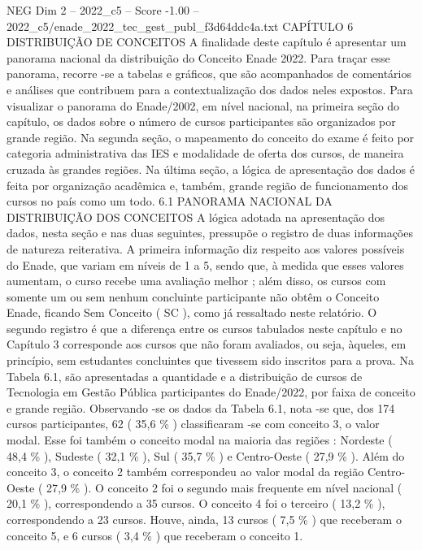 \begin{textsample}{NEG Dim 2 – 2022\_c5 – Score -1.00 – 2022\_c5/enade\_2022\_tec\_gest\_publ\_f3d64ddc4a.txt}  \label{ex:f2_neg_220}
CAPÍTULO 6 DISTRIBUIÇÃO DE CONCEITOS A finalidade deste capítulo é apresentar um panorama nacional da distribuição do Conceito Enade 2022.
Para traçar esse panorama, recorre -se a tabelas e gráficos, que são acompanhados de comentários e análises que contribuem para a contextualização dos dados neles expostos.
Para visualizar o panorama do Enade/2002, em nível nacional, na primeira seção do capítulo, os dados sobre o número de cursos participantes são organizados por grande região.
Na segunda seção, o mapeamento do conceito do exame é feito por categoria administrativa das IES e modalidade de oferta dos cursos, de maneira cruzada às grandes regiões.
Na última seção, a lógica de apresentação dos dados é feita por organização acadêmica e, também, grande região de funcionamento dos cursos no país como um todo. 6.1 PANORAMA NACIONAL DA DISTRIBUIÇÃO DOS CONCEITOS A lógica adotada na apresentação dos dados, nesta seção e nas duas seguintes, pressupõe o registro de duas informações de natureza reiterativa.
A primeira informação diz respeito aos valores possíveis do Enade, que variam em níveis de 1 a 5, sendo que, à medida que esses valores aumentam, o curso recebe uma avaliação melhor ; além disso, os cursos com somente um ou sem nenhum concluinte participante não obtêm o Conceito Enade, ficando Sem Conceito ( SC ), como já ressaltado neste relatório.
O segundo registro é que a diferença entre os cursos tabulados neste capítulo e no Capítulo 3 corresponde aos cursos que não foram avaliados, ou seja, àqueles, em princípio, sem estudantes concluintes que tivessem sido inscritos para a prova.
Na Tabela 6.1, são apresentadas a quantidade e a distribuição de cursos de Tecnologia em Gestão Pública participantes do Enade/2022, por faixa de conceito e grande região.
Observando -se os dados da Tabela 6.1, nota -se que, dos 174 cursos participantes, 62 ( 35,6 \% ) classificaram -se com conceito 3, o valor modal.
Esse foi também o conceito modal na maioria das regiões : Nordeste ( 48,4 \% ), Sudeste ( 32,1 \% ), Sul ( 35,7 \% ) e Centro-Oeste ( 27,9 \% ).
Além do conceito 3, o conceito 2 também correspondeu ao valor modal da região Centro-Oeste ( 27,9 \% ).
O conceito 2 foi o segundo mais frequente em nível nacional ( 20,1 \% ), correspondendo a 35 cursos.
O conceito 4 foi o terceiro ( 13,2 \% ), correspondendo a 23 cursos.
Houve, ainda, 13 cursos ( 7,5 \% ) que receberam o conceito 5, e 6 cursos ( 3,4 \% ) que receberam o conceito 1.

\end{textsample}
